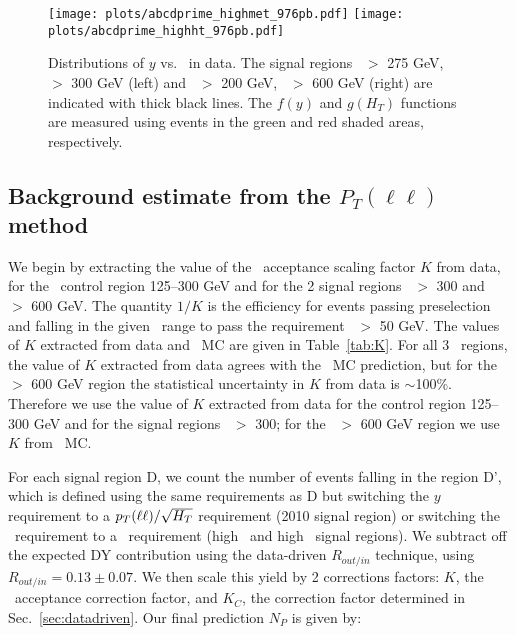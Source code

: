 \begin{figure}[hbt]
\begin{center}
\texttt{[image: plots/abcdprime\_highmet\_976pb.pdf]}
\texttt{[image: plots/abcdprime\_highht\_976pb.pdf]}
\caption{\label{fig:abcdprimedata}\protect 
Distributions of $y$ vs. \Ht\ in data. The signal regions \met\ $>$ 275 GeV, \Ht\ $>$ 300 GeV (left)
and \met\ $>$ 200 GeV, \Ht\ $>$ 600 GeV (right) are indicated with thick black lines. 
The $f(y)$ and $g(H_T)$ 
functions are measured using events in the green and red shaded areas, respectively.
}
\end{center}
\end{figure}

\subsection{Background estimate from the $P_T(\ell\ell)$ method}
\label{sec:victoryres}

We begin by extracting the value of the \met\ acceptance scaling factor $K$ from data,
for the \Ht\ control region 125--300 GeV and for the 2 signal regions \Ht\ $>$ 300 and
\Ht\ $>$ 600 GeV. The quantity $1/K$ is the efficiency for events passing preselection
and falling in the given \Ht\ range to pass the requirement \ptll\ $>$ 50 GeV.
The values of $K$ extracted from data and \ttbar\ MC are given in Table~\ref{tab:K}.
For all 3 \Ht\ regions, the value of $K$ extracted from data agrees with the 
\ttbar\ MC prediction, but for the \Ht\ $>$ 600 GeV region the statistical uncertainty
in $K$ from data is $\sim$100\%. Therefore we use the value of $K$ extracted from
data for the control region 125--300 GeV and for the signal regions \Ht\ $>$ 300;
for the \Ht\ $>$ 600 GeV region we use $K$ from \ttbar\ MC.

For each signal region D, we count the number of events falling in the region D', which is defined
using the same requirements as D but switching the $y$ requirement to a $p_T(\ell\ell)/\sqrt{H_T}$ requirement (2010 signal region)
or switching the \met\ requirement to a \ptll\ requirement (high \met\ and high \Ht\ signal regions).
We subtract off the expected DY contribution using the data-driven $R_{out/in}$ technique, using $R_{out/in} = 0.13 \pm 0.07$.
We then scale this yield by 2 corrections factors:
$K$, the \met\ acceptance correction factor, and $K_C$, the correction factor determined in Sec.~\ref{sec:datadriven}.
Our final prediction $N_P$ is given by:

